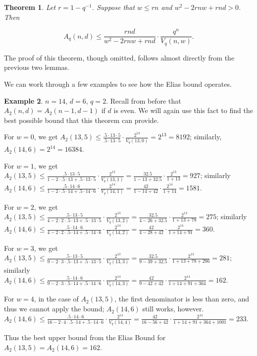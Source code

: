 \documentclass{article}
\theoremstyle{plain}
\newtheorem{theorem}{Theorem}[section]
\theoremstyle{definition}
\newtheorem{exmp}[theorem]{Example}
\begin{document}
\begin{theorem}
Let $r=  1-q^{-1}$.  Suppose that $w\le rn$ and $w^2 - 2rnw + rnd > 0$.  Then

\begin{equation}
A_q(n,d) \le \frac{rnd}{w^2 - 2rnw + rnd}\cdot \frac{q^n}{V_q(n,w)}.
\end{equation}
\end{theorem}

The proof of this theorem, though omitted, follows almost directly from the previous two lemmas.

We can work through a few examples to see how the Elias bound operates.

\begin{exmp}
$n=14$, $d=6$, $q=2$. 
Recall from before that $A_2(n,d)=A_2(n-1,d-1)$ if $d$ is even.  We will again use this fact to find the best possible bound that this theorem can provide. 

 For $w=0$, 
we get $A_2(13,5)\le \frac{.5\cdot13\cdot5}{.5\cdot13\cdot5}\cdot\frac{2^{13}}{V_q(13,0)} = 2^{13} = 8192$; similarly, $A_2(14,6) = 2^{14} = 16384$.

 For $w=1$, 
we get $A_2(13,5)\le \frac{.5\cdot13\cdot5}{1 - 2\cdot.5\cdot13 + .5\cdot13\cdot5}\cdot\frac{2^{13}}{V_q(13,1)} = \frac{32.5}{1-13+32.5}\cdot\frac{2^{13}}{1+13} = 927$;
similarly $A_2(14,6)\le \frac{.5\cdot14\cdot6}{1 - 2\cdot.5\cdot14 + .5\cdot14\cdot6}\cdot\frac{2^{14}}{V_q(14,1)} = \frac{42}{1-14+42}\cdot\frac{2^{14}}{1+14} = 1581$.

For $w=2$, 
we get  $A_2(13,5)\le \frac{.5\cdot13\cdot5}{4 - 2\cdot2\cdot.5\cdot13 + .5\cdot13\cdot5}\cdot\frac{2^{13}}{V_q(13,2)} = \frac{32.5}{4-26+32.5}\cdot\frac{2^{13}}{1+13+78} = 275$;
similarly $A_2(14,6)\le \frac{.5\cdot14\cdot6}{4 - 2\cdot2\cdot.5\cdot14 + .5\cdot14\cdot6}\cdot\frac{2^{14}}{V_q(14,2)} = \frac{42}{4-28+42}\cdot\frac{2^{14}}{1+14+91} = 360$.

For $w=3$, 
we get  $A_2(13,5)\le \frac{.5\cdot13\cdot5}{9 - 2\cdot3\cdot.5\cdot13 + .5\cdot13\cdot5}\cdot\frac{2^{13}}{V_q(13,3)} = \frac{32.5}{9-39+32.5}\cdot\frac{2^{13}}{1+13+78+286} = 281$;
similarly $A_2(14,6)\le \frac{.5\cdot14\cdot6}{9 - 2\cdot3\cdot.5\cdot14 + .5\cdot14\cdot6}\cdot\frac{2^{14}}{V_q(14,3)} = \frac{42}{9-42+42}\cdot\frac{2^{14}}{1+14+91+ 364} = 162$.

For $w=4$,
in the case of $A_2(13,5)$, the first denominator is less than zero, and thus we cannot apply the bound; $A_2(14,6)$ still works, however.  
$A_2(14,6)\le \frac{.5\cdot14\cdot6}{16 - 2\cdot4\cdot.5\cdot14 + .5\cdot14\cdot6}\cdot\frac{2^{14}}{V_q(14,4)} = \frac{42}{16-56+42}\cdot\frac{2^{14}}{1+14+91+ 364+1001} = 233$.

Thus the best upper bound from the Elias Bound for $A_2(13,5)=A_2(14,6)=162$.

\end{exmp}
\end{document}
